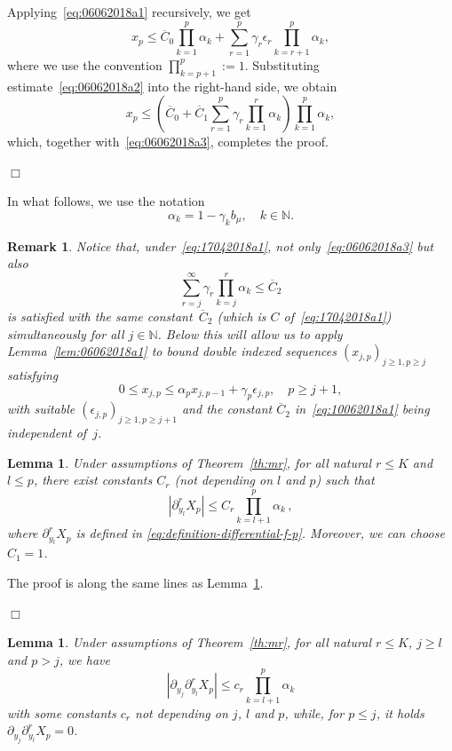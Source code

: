 \documentclass[preprint]{imsart}
\newcommand{\proofendsign}{$\Box$}
\newtheorem{lem}[thm]{Lemma}
\newtheorem{remark}{Remark}
\newenvironment{proof}{{\noindent \bf Proof }}
 {{\hspace*{\fill}\proofendsign\par\bigskip}}
\newcommand*{\ol}{\overline}
\begin{document}
\begin{proof}
Applying~\eqref{eq:06062018a1} recursively, we get
$$
x_p\le\ol C_0\prod_{k=1}^p \alpha_k
+\sum_{r=1}^p \gamma_r\epsilon_r
\prod_{k=r+1}^p \alpha_k,
$$
where we use the convention $\prod_{k=p+1}^p:=1$.
Substituting estimate~\eqref{eq:06062018a2}
into the right-hand side, we obtain
$$
x_p\le\left(\ol C_0+\ol C_1
\sum_{r=1}^p \gamma_r \prod_{k=1}^r \alpha_k
\right)
\prod_{k=1}^p \alpha_k,
$$
which, together with~\eqref{eq:06062018a3}, completes the proof.
\end{proof}

In what follows, we use the notation
\begin{equation}
\label{eq:definition-alpha}
\alpha_k=1-\gamma_k b_\mu,\quad k\in\mathbb N.
\end{equation}

\begin{remark}\label{rem:10062018a1}
Notice that, under~\eqref{eq:17042018a1},
not only~\eqref{eq:06062018a3} but also
\begin{equation}\label{eq:10062018a1}
\sum_{r=j}^\infty\gamma_r \prod_{k=j}^r \alpha_k\le\ol C_2
\end{equation}
is satisfied with the same constant~$\ol C_2$
(which is $C$ of~\eqref{eq:17042018a1})
simultaneously for all $j\in\mathbb N$.
Below this will allow us to apply
Lemma~\ref{lem:06062018a1}
to bound double indexed sequences
$(x_{j,p})_{j\ge1,p\ge j}$
satisfying
$$
0\le x_{j,p}\le\alpha_p x_{j,p-1}+\gamma_p \epsilon_{j,p},\quad p\ge j+1,
$$
with suitable $(\epsilon_{j,p})_{j\ge1,p\ge j+1}$
and the constant $\ol C_2$ in~\eqref{eq:10062018a1}
being independent of~$j$.
\end{remark}

\begin{lem}\label{lem:06062018a2}
Under assumptions of Theorem~\ref{th:mr},
for all natural $r\le K$ and $l\le p$, there exist constants $C_r$ (not depending on $l$ and $p$) such that
\begin{equation}
\label{eq:08062018b2}
\left|\partial_{y_l}^r X_p \right| \le C_r\prod_{k=l+1}^p \alpha_k \,,
\end{equation}
where $\partial_{y_l}^r X_p$ is defined in \eqref{eq:definition-differential-f-p}. Moreover, we can choose $C_1=1$.
\end{lem}
\begin{proof}
The proof is along the same lines as Lemma~\ref{lem:06062018a3}.
\end{proof}
\begin{lem}\label{lem:06062018a3}
Under assumptions of Theorem~\ref{th:mr},
for all natural $r\le K$, $j\ge l$ and $p>j$, we have
\begin{equation}\label{eq:08062018b3}
\left|\partial_{y_j} \partial_{y_l}^r X_p\right|
\le c_r\prod_{k=l+1}^p \alpha_k
\end{equation}
with some constants $c_r$
not depending on $j$, $l$ and $p$,
while, for $p\le j$, it holds
$\partial_{y_{j}}\partial_{y_{l}}^{r}X_{p}=0$.
\end{lem}
\end{document}

